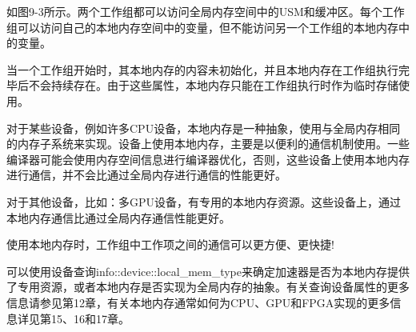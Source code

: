 如图9-3所示。两个工作组都可以访问全局内存空间中的USM和缓冲区。每个工作组可以访问自己的本地内存空间中的变量，但不能访问另一个工作组的本地内存中的变量。\par

当一个工作组开始时，其本地内存的内容未初始化，并且本地内存在工作组执行完毕后不会持续存在。由于这些属性，本地内存只能在工作组执行时作为临时存储使用。\par

对于某些设备，例如许多CPU设备，本地内存是一种抽象，使用与全局内存相同的内存子系统来实现。设备上使用本地内存，主要是以便利的通信机制使用。一些编译器可能会使用内存空间信息进行编译器优化，否则，这些设备上使用本地内存进行通信，并不会比通过全局内存进行通信的性能更好。\par

对于其他设备，比如：多GPU设备，有专用的本地内存资源。这些设备上，通过本地内存通信比通过全局内存通信性能更好。\par

\begin{tcolorbox}[colback=red!5!white,colframe=red!75!black]
使用本地内存时，工作组中工作项之间的通信可以更方便、更快捷!
\end{tcolorbox}

可以使用设备查询info::device::local\_mem\_type来确定加速器是否为本地内存提供了专用资源，或者本地内存是否实现为全局内存的抽象。有关查询设备属性的更多信息请参见第12章，有关本地内存通常如何为CPU、GPU和FPGA实现的更多信息详见第15、16和17章。\par





































